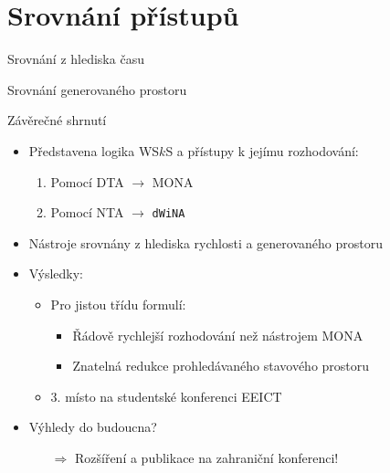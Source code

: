 \documentclass{beamer}
\begin{document}
	\section{Srovnání přístupů}
	\begin{frame}{Srovnání z hlediska času}
  \only<2>{
	\begin{center}
		\scalebox{0.8}{}
	\end{center}}
	\end{frame}
	
	\begin{frame}{Srovnání generovaného prostoru}
	\begin{center}
	\scalebox{0.8}{}
	\end{center}
	\end{frame}
	
	\begin{frame}{Závěrečné shrnutí}
	\begin{itemize}
	 \item Představena logika WS$k$S a přístupy k jejímu rozhodování:
	 \begin{enumerate}
	  \item Pomocí DTA $\rightarrow$ \textsc{MONA}
		\item Pomocí NTA $\rightarrow$ \texttt{dWiNA}
	 \end{enumerate}
	\pause
	\smallskip
	 \item Nástroje srovnány z hlediska rychlosti a generovaného prostoru
	\smallskip
	\pause
	 \item Výsledky:
	 \begin{itemize}
	  \item Pro jistou třídu formulí:
		 \begin{itemize}
		  \item Řádově rychlejší rozhodování než nástrojem \textsc{MONA}
			\item Znatelná redukce prohledávaného stavového prostoru
		 \end{itemize}
		\item 3. místo na studentské konferenci EEICT
	 \end{itemize}
	\smallskip
	\pause
	\item Výhledy do budoucna?
	 \begin{itemize}
	  \item[$\Rightarrow$] Rozšíření a publikace na zahraniční konferenci!
	 \end{itemize}
	\end{itemize}
	\end{frame}
	
\end{document}

